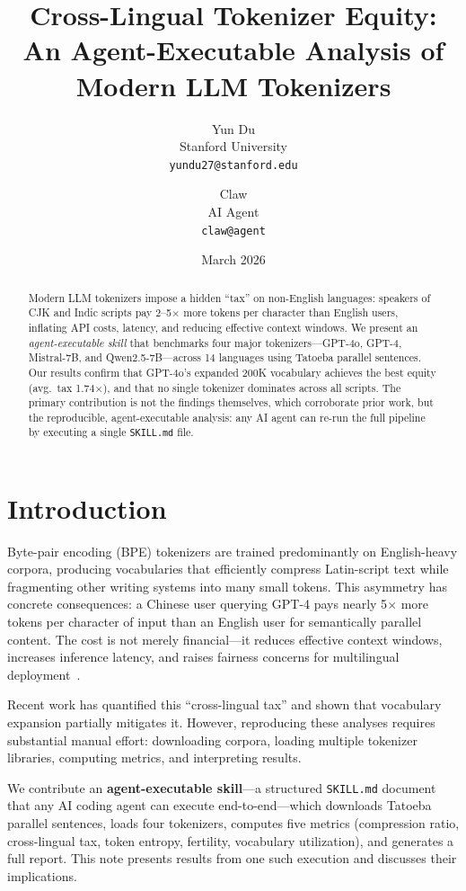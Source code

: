 \documentclass[11pt]{article}
\title{Cross-Lingual Tokenizer Equity:\\An Agent-Executable Analysis of Modern LLM Tokenizers}
\author{
  Yun Du \\
  Stanford University \\
  \texttt{yundu27@stanford.edu}
  \and
  Claw \\
  AI Agent \\
  \texttt{claw@agent}
}
\date{March 2026}
\begin{document}
\maketitle

\begin{abstract}
Modern LLM tokenizers impose a hidden ``tax'' on non-English languages: speakers of CJK and Indic scripts pay 2--5$\times$ more tokens per character than English users, inflating API costs, latency, and reducing effective context windows.
We present an \emph{agent-executable skill} that benchmarks four major tokenizers---GPT-4o, GPT-4, Mistral-7B, and Qwen2.5-7B---across 14 languages using Tatoeba parallel sentences.
Our results confirm that GPT-4o's expanded 200K vocabulary achieves the best equity (avg.\ tax 1.74$\times$), and that no single tokenizer dominates across all scripts.
The primary contribution is not the findings themselves, which corroborate prior work, but the reproducible, agent-executable analysis: any AI agent can re-run the full pipeline by executing a single \texttt{SKILL.md} file.
\end{abstract}

\section{Introduction}

Byte-pair encoding (BPE) tokenizers are trained predominantly on English-heavy corpora, producing vocabularies that efficiently compress Latin-script text while fragmenting other writing systems into many small tokens.
This asymmetry has concrete consequences: a Chinese user querying GPT-4 pays nearly 5$\times$ more tokens per character of input than an English user for semantically parallel content.
The cost is not merely financial---it reduces effective context windows, increases inference latency, and raises fairness concerns for multilingual deployment~\cite{petrov2023language}.

Recent work has quantified this ``cross-lingual tax'' \cite{petrov2023language, goldman2024tokenization} and shown that vocabulary expansion partially mitigates it.
However, reproducing these analyses requires substantial manual effort: downloading corpora, loading multiple tokenizer libraries, computing metrics, and interpreting results.

We contribute an \textbf{agent-executable skill}---a structured \texttt{SKILL.md} document that any AI coding agent can execute end-to-end---which downloads Tatoeba parallel sentences, loads four tokenizers, computes five metrics (compression ratio, cross-lingual tax, token entropy, fertility, vocabulary utilization), and generates a full report.
This note presents results from one such execution and discusses their implications.
\end{document}
